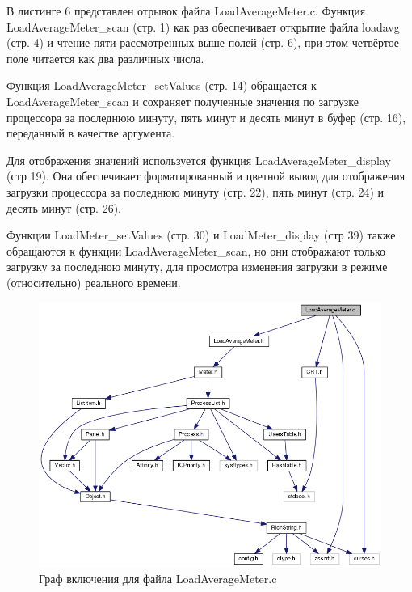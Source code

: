 \documentclass[a4paper, 12pt]{article}		%
\begin{document}
В листинге 6 представлен отрывок файла LoadAverageMeter.c. Функция LoadAverageMeter\_scan (стр. 1) как раз обеспечивает открытие файла loadavg (стр. 4) и чтение пяти рассмотренных выше полей (стр. 6), при этом четвёртое поле читается как два различных числа.

Функция LoadAverageMeter\_setValues (стр. 14) обращается к LoadAverageMeter\_scan и сохраняет полученные значения по загрузке процессора за последнюю минуту, пять минут и десять минут в буфер (стр. 16), переданный в качестве аргумента.

Для отображения значений используется функция LoadAverageMeter\_display (стр 19). Она обеспечивает форматированный и цветной вывод для отображения загрузки процессора за последнюю минуту (стр. 22), пять минут (стр. 24) и десять минут (стр. 26).

Функции LoadMeter\_setValues (стр. 30) и LoadMeter\_display (стр 39) также обращаются к функции LoadAverageMeter\_scan, но они отображают только загрузку за последнюю минуту, для просмотра изменения загрузки в режиме (относительно) реального времени.

\newpage


\begin{figure}[h!]
\centering
\includegraphics[scale=0.55]{res/load_average_meter.png}
\caption{Граф включения для файла LoadAverageMeter.c}
\end{figure}
\end{document}
